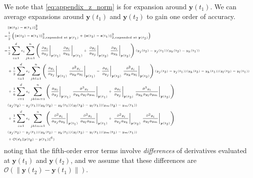 We note that \eqref{eq:appendix_z_norm} is for expansion around $\mathbf{y}(t_1)$. 
%
We can average expansions around $\mathbf{y}(t_1)$ and $\mathbf{y}(t_2)$ to gain one order of accuracy. 
%
\begin{equation} \label{eq:mahalanobis_taylor_explansion}
\tiny
\begin{aligned}
& \|\mathbf{z}(t_2) - \mathbf{z}(t_1)\|_2^2 \\
=& \frac{1}{2} \left( \|\mathbf{z}(t_2) - \mathbf{z}(t_1)\|_{2, \text{expanded at } \mathbf{y}(t_1)}^2  + \|\mathbf{z}(t_2) - \mathbf{z}(t_1)\|_{2, \text{expanded at } \mathbf{y}(t_2)}^2 \right) \\
=& 
\frac{1}{2} \sum_{i=1}^d e_i \sum_{jk=1}^n \left( \left. \frac{\partial g_i}{\partial y_j} \right|_{\mathbf{y}(t_1)} \left. \frac{\partial g_i}{\partial y_k} \right|_{\mathbf{y}(t_1)} + \left. \frac{\partial g_i}{\partial y_j} \right|_{\mathbf{y}(t_2)} \left. \frac{\partial g_i}{\partial y_k} \right|_{\mathbf{y}(t_2)} \right) (y_j(t_2)-y_j(t_1)) (y_k(t_2)-y_k(t_1)) \\
&+ \frac{1}{2} \sum_{i=1}^d e_i \sum_{jkl=1}^n \left( \left. \frac{\partial g_i}{\partial y_j} \right|_{\mathbf{y}(t_1)} \left. \frac{\partial^2 g_i}{\partial y_k \partial y_l} \right|_{\mathbf{y}(t_1)} - \left. \frac{\partial g_i}{\partial y_j} \right|_{\mathbf{y}(t_2)} \left. \frac{\partial^2 g_i}{\partial y_k \partial y_l} \right|_{\mathbf{y}(t_2)} \right) (y_j(t_2)-y_j(t_1))  (y_k(t_2)-y_k(t_1)) (y_l(t_2)-y_l(t_1)) \\
&+ \frac{1}{6} \sum_{i=1}^d e_i \sum_{jklm=1}^n \left( \left. \frac{\partial g_i}{\partial y_j} \right|_{\mathbf{y}(t_1)} \left. \frac{\partial^3 g_i}{ \partial y_k \partial y_l \partial y_m} \right|_{\mathbf{y}(t_1)} + \left. \frac{\partial g_i}{\partial y_j} \right|_{\mathbf{y}(t_2)} \left. \frac{\partial^3 g_i}{ \partial y_k \partial y_l \partial y_m} \right|_{\mathbf{y}(t_2)} \right) 
\\ &(y_j(t_2)-y_j(t_1)) (y_k(t_2)-y_k(t_1)) (y_l(t_2)-y_l(t_1))(y_m(t_2)-y_m(t_1)) \\
&+ \frac{1}{8} \sum_{i=1}^d e_i \sum_{jklm=1}^n \left( \left. \frac{\partial^2 g_i}{\partial y_j \partial y_k} \right|_{\mathbf{y}(t_1)} \left. \frac{\partial^2 g_i}{\partial y_l \partial y_m} \right|_{\mathbf{y}(t_1)} + \left. \frac{\partial^2 g_i}{\partial y_j \partial y_k} \right|_{\mathbf{y}(t_2)} \left. \frac{\partial^2 g_i}{\partial y_l \partial y_m} \right|_{\mathbf{y}(t_2)} \right) 
\\ &(y_j(t_2)-y_j(t_1)) (y_k(t_2)-y_k(t_1)) (y_l(t_2)-y_l(t_1)) (y_m(t_2)-y_m(t_1)) \\
&+ \mathcal{O}({d_1} \|\mathbf{y}(t_2) - \mathbf{y}(t_1) \|^6)
\end{aligned}
\end{equation}
%
noting that the fifth-order error terms involve {\em differences} of derivatives evaluated at $\mathbf{y}(t_1)$ and $\mathbf{y}(t_2)$, and we assume that these differences are $\mathcal{O} (\| \mathbf{y}(t_2) - \mathbf{y}(t_1) \|)$. 

